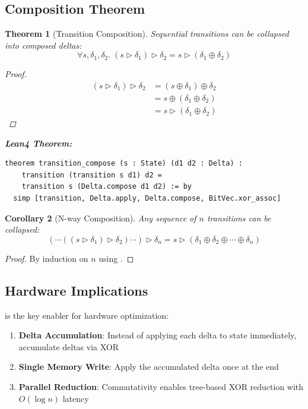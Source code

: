 \documentclass[11pt,letterpaper]{article}
\theoremstyle{plain}
\newtheorem{theorem}{Theorem}[section]
\newtheorem{corollary}[theorem]{Corollary}
\theoremstyle{definition}
\theoremstyle{remark}
\newcommand{\dcompose}{\oplus}           %
\newcommand{\transition}{\triangleright} %
\begin{document}
\subsection{Composition Theorem}

\begin{theorem}[Transition Composition]
\label{thm:transition-compose}
Sequential transitions can be collapsed into composed deltas:
\[
\forall s, \delta_1, \delta_2.\; (s \transition \delta_1) \transition \delta_2 = s \transition (\delta_1 \dcompose \delta_2)
\]

\begin{proof}
\begin{align*}
(s \transition \delta_1) \transition \delta_2 
&= (s \oplus \delta_1) \oplus \delta_2 \\
&= s \oplus (\delta_1 \oplus \delta_2) \tag{Associativity} \\
&= s \transition (\delta_1 \dcompose \delta_2)
\end{align*}
\end{proof}

\medskip
\noindent\textbf{Lean4 Theorem:}
\begin{lstlisting}
theorem transition_compose (s : State) (d1 d2 : Delta) :
    transition (transition s d1) d2 = 
    transition s (Delta.compose d1 d2) := by
  simp [transition, Delta.apply, Delta.compose, BitVec.xor_assoc]
\end{lstlisting}
\end{theorem}

\begin{corollary}[N-way Composition]
\label{cor:nway}
Any sequence of $n$ transitions can be collapsed:
\[
(\cdots((s \transition \delta_1) \transition \delta_2) \cdots) \transition \delta_n = s \transition (\delta_1 \dcompose \delta_2 \dcompose \cdots \dcompose \delta_n)
\]
\end{corollary}

\begin{proof}
By induction on $n$ using .
\end{proof}

\subsection{Hardware Implications}

 is the key enabler for hardware optimization:

\begin{enumerate}
    \item \textbf{Delta Accumulation}: Instead of applying each delta to state immediately, accumulate deltas via XOR
    \item \textbf{Single Memory Write}: Apply the accumulated delta once at the end
    \item \textbf{Parallel Reduction}: Commutativity enables tree-based XOR reduction with $O(\log n)$ latency
\end{enumerate}
\end{document}
